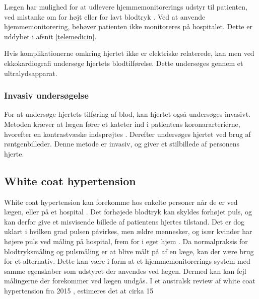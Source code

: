 Lægen har mulighed for at udlevere hjemmemonitorerings udstyr til patienten, ved mistanke om for højt eller for lavt blodtryk \citep{hjerud}. Ved at anvende hjemmemonitorering, behøver patienten ikke monitoreres på hospitalet. Dette er uddybet i afsnit \ref{telemedicin}.

Hvis komplikationerne omkring hjertet ikke er elektriske relaterede, kan men ved ekkokardiografi undersøge hjertets blodtilførelse. Dette undersøges gennem et ultralydsapparat.



\subsubsection{Invasiv undersøgelse}
For at undersøge hjertets tilføring af blod, kan hjertet også undersøges invasivt.
Metoden kræver at lægen fører et kateter ind i patientens koronararterierne, hvorefter en kontrastvæske indsprøjtes \citep{hjerud}. Derefter undersøges hjertet ved brug af røntgenbilleder. Denne metode er invasiv, og giver et stilbillede af personens hjerte. 


\subsection{White coat hypertension}
White coat hypertension kan forekomme hos enkelte personer når de er ved lægen, eller på et hospital \citep{wch}. Det forhøjede blodtryk kan skyldes forhøjet puls, og kan derfor give et misvisende billede af patientens hjertes tilstand. Det er dog uklart i hvilken grad pulsen påvirkes, men ældre mennesker, og især kvinder har højere puls ved måling på hospital, frem for i eget hjem  \citep{bpm}. Da normalpraksis for blodtryksmåling og pulsmåling er at blive målt på af en læge, kan der være brug for et alternativ. Dette kan være i form at et hjemmemonitorerings system med samme egenskaber som udstyret der anvendes ved lægen. Dermed kan kan fejl målingerne der forekommer ved lægen undgås. I et australsk review af white coat hypertension fra 2015 \citep{wch}, estimeres det at cirka 15%



